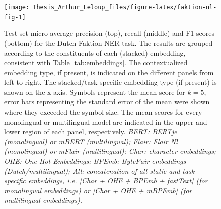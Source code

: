 \documentclass[12pt,a4paper,]{book}
\begin{document}
\begin{figure}

{\centering \texttt{[image: Thesis\_Arthur\_Leloup\_files/figure-latex/faktion-nl-fig-1]} 

}

\caption{Test-set micro-average precision (top), recall (middle) and F1-scores (bottom) for the Dutch Faktion NER task. The results are grouped according to the constituents of each (stacked) embedding, consistent with Table \ref{tab:embeddings}. The contextualized embedding type, if present, is indicated on the different panels from left to right. The stacked/task-specific embedding type (if present) is shown on the x-axis. Symbols represent the mean score for \(k = 5\), error bars representing the standard error of the mean were shown where they exceeded the symbol size. The mean scores for every monolingual or multilingual model are indicated in the upper and lower region of each panel, respectively. \emph{BERT: BERTje (monolingual) or mBERT (multilingual); Flair: Flair Nl (monolingual) or mFlair (multilingual); Char: character embeddings; OHE: One Hot Embeddings; BPEmb: BytePair embeddings (Dutch/multilingual); All: concatenation of all static and task-specific embeddings, i.e. {[}Char + OHE + BPEmb + fastText{]} (for monolingual embeddings) or {[}Char + OHE + mBPEmb{]} (for multilingual embeddings).}}\label{fig:faktion-nl-fig}
\end{figure}
\end{document}
